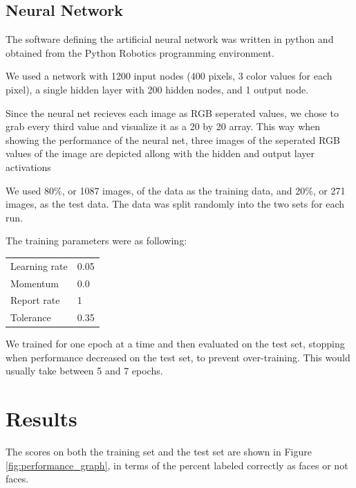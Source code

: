 \documentclass[11pt]{article}
\begin{document}
\subsection{Neural Network}

The software defining the artificial neural network was written in python and obtained from the Python Robotics programming environment.

We used a network with 1200 input nodes (400 pixels, 3 color values for each pixel), a single hidden layer with 200 hidden nodes, and 1 output node.

Since the neural net recieves each image as RGB seperated values, we chose to grab every third value and visualize it as a 20 by 20 array. This way when showing the performance of the neural net, three images of the seperated RGB values of the image are depicted allong with the hidden and output layer activations

We used 80\%, or 1087 images, of the data as the training data, and 20\%, or 271 images, as the test data. The data was split randomly into the two sets for each run.


The training parameters were as following:

\begin{table}[h]
\begin{tabular}{ll}
Learning rate & 0.05  \\
Momentum      & 0.0 \\
Report rate   & 1    \\
Tolerance     & 0.35
\end{tabular}
\end{table}

We trained for one epoch at a time and then evaluated on the test set, stopping when performance decreased on the test set, to prevent over-training. This would usually take between 5 and 7 epochs.

\section{Results}


The scores on both the training set and the test set are shown in Figure \ref{fig:performance_graph}, in terms of the percent labeled correctly as faces or not faces.
\end{document}
